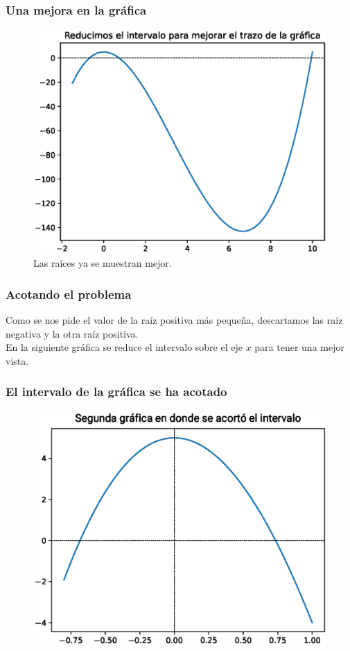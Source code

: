 \documentclass[12pt]{beamer}
\begin{document}
\begin{frame}
\frametitle{Una mejora en la gráfica}
\begin{figure}
    \centering
    \includegraphics[scale=0.5]{Imagenes/aprox_sucesivas_01b.eps}
    \caption{Las raíces ya se muestran mejor.} 
\end{figure}
\end{frame}
\begin{frame}
\frametitle{Acotando el problema}
Como se nos pide el valor de la raíz positiva más pequeña, descartamos las raíz negativa y la otra raíz positiva.
\\
\bigskip
\pause
En la siguiente gráfica se reduce el intervalo sobre el eje $x$ para tener una mejor vista.
\end{frame}
\begin{frame}
\frametitle{El intervalo de la gráfica se ha acotado}
\begin{figure}
	\centering
	\includegraphics[scale=0.5]{Imagenes/aprox_sucesivas_02.eps}
\end{figure}
\end{frame}
\end{document}

